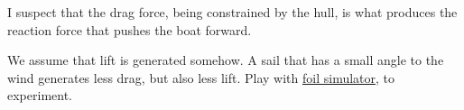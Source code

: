 \documentclass{article}
\begin{document}
I suspect that the drag force, being constrained by the hull, is what produces
the reaction force that pushes the boat forward.

We assume that lift is generated somehow. A sail that has a small angle to the
wind generates less drag, but also less lift. Play with
\href{https://www.grc.nasa.gov/www/k-12/airplane/foil3.html}{foil simulator}, to
experiment.
\end{document}
